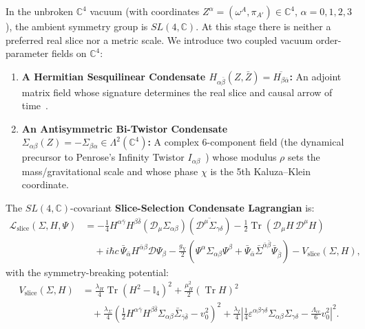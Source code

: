 \documentclass[11pt,a4paper]{article}
\begin{document}
In the unbroken $\mathbb{C}^4$ vacuum (with coordinates $Z^\alpha = (\omega^A, \pi_{A'}) \in \mathbb{C}^4$, $\alpha = 0,1,2,3$), the ambient symmetry group is $SL(4,\mathbb{C})$. At this stage there is neither a preferred real slice nor a metric scale. We introduce two coupled vacuum order-parameter fields on $\mathbb{C}^4$:
\begin{enumerate}
    \item \textbf{A Hermitian Sesquilinear Condensate $H_{\alpha\bar{\beta}}(Z, \bar{Z}) = \overline{H_{\beta\bar{\alpha}}}$:} An adjoint matrix field whose signature determines the real slice and causal arrow of time~\cite{Penrose1967}.
    \item \textbf{An Antisymmetric Bi-Twistor Condensate $\Sigma_{\alpha\beta}(Z) = -\Sigma_{\beta\alpha} \in \Lambda^2(\mathbb{C}^4)$:} A complex 6-component field (the dynamical precursor to Penrose's Infinity Twistor $I_{\alpha\beta}$~\cite{PenroseRindler1984}) whose modulus $\rho$ sets the mass/gravitational scale and whose phase $\chi$ is the 5th Kaluza--Klein coordinate.
\end{enumerate}

The $SL(4,\mathbb{C})$-covariant \textbf{Slice-Selection Condensate Lagrangian} is:
\begin{equation}
\begin{aligned}
\mathcal{L}_{\text{slice}}(\Sigma, H, \Psi) &= -\frac{1}{4} H^{\alpha\bar{\gamma}} H^{\beta\bar{\delta}} \left( \mathcal{D}_\mu \Sigma_{\alpha\beta} \right) \left( \overline{\mathcal{D}^\mu \Sigma_{\gamma\delta}} \right) - \frac{1}{2} \operatorname{Tr}\!\left( \mathcal{D}_\mu H\, \mathcal{D}^\mu H \right) \\
&\quad + i\hbar c\, \bar{\Psi}_{\bar{\alpha}} H^{\bar{\alpha}\beta} \mathcal{D}\Psi_\beta - \frac{g_{\text{Y}}}{2} \left( \Psi^\alpha \Sigma_{\alpha\beta} \Psi^\beta + \bar{\Psi}_{\bar{\alpha}} \bar{\Sigma}^{\bar{\alpha}\bar{\beta}} \bar{\Psi}_{\bar{\beta}} \right) - V_{\text{slice}}(\Sigma, H),
\end{aligned}
\end{equation}
with the symmetry-breaking potential:
\begin{equation}
\begin{aligned}
V_{\text{slice}}(\Sigma, H) &= \frac{\lambda_H}{4} \operatorname{Tr}\!\left( H^2 - \mathbb{I}_4 \right)^2 + \frac{\mu_H^2}{2} \left( \operatorname{Tr} H \right)^2 \\
&\quad + \frac{\lambda_\Sigma}{4} \left( \frac{1}{2} H^{\alpha\bar{\gamma}} H^{\beta\bar{\delta}} \Sigma_{\alpha\beta} \bar{\Sigma}_{\bar{\gamma}\bar{\delta}} - v_0^2 \right)^2 + \frac{\lambda_I}{4} \left| \frac{1}{4} \varepsilon^{\alpha\beta\gamma\delta} \Sigma_{\alpha\beta} \Sigma_{\gamma\delta} - \frac{\Lambda_{\text{cc}}}{6} v_0^2 \right|^2.
\end{aligned}
\end{equation}
\end{document}
